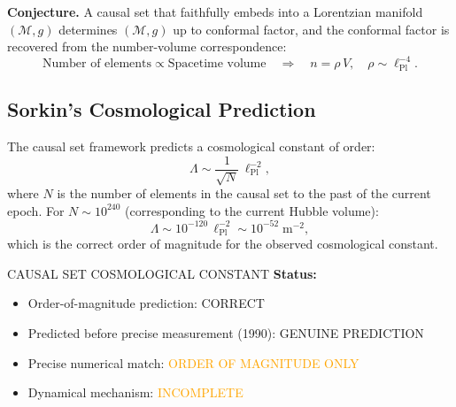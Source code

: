 \begin{theorem}
\label{thm:hauptvermutung}
\textbf{Conjecture.} A causal set that faithfully embeds into a Lorentzian
manifold $(\mathcal{M}, g)$ determines $(\mathcal{M}, g)$ up to conformal
factor, and the conformal factor is recovered from the number-volume
correspondence:
\begin{equation}
\text{Number of elements} \propto \text{Spacetime volume}
\quad \Longrightarrow \quad
n = \rho\, V, \quad \rho \sim \ell_{\mathrm{Pl}}^{-4}.
\end{equation}
\end{theorem}

\subsection{Sorkin's Cosmological Prediction}

\begin{proposition}
\label{prop:cc_causal_sets}
The causal set framework predicts a cosmological constant of order:
\begin{equation}
\Lambda \sim \frac{1}{\sqrt{N}}\, \ell_{\mathrm{Pl}}^{-2},
\end{equation}
where $N$ is the number of elements in the causal set to the past of the
current epoch.  For $N \sim 10^{240}$ (corresponding to the current Hubble
volume):
\begin{equation}
\Lambda \sim 10^{-120}\, \ell_{\mathrm{Pl}}^{-2}
\sim 10^{-52}\;\text{m}^{-2},
\end{equation}
which is the correct order of magnitude for the observed cosmological
constant.
\end{proposition}

\begin{factcheck}{CAUSAL SET COSMOLOGICAL CONSTANT}
\textbf{Status:}
\begin{itemize}
    \item Order-of-magnitude prediction:
          \textcolor{validcolor}{CORRECT}~\cite{sorkin2003causal}
    \item Predicted before precise measurement (1990):
          \textcolor{validcolor}{GENUINE PREDICTION}
    \item Precise numerical match: \textcolor{orange}{ORDER OF MAGNITUDE ONLY}
    \item Dynamical mechanism: \textcolor{orange}{INCOMPLETE}
\end{itemize}
\end{factcheck}

